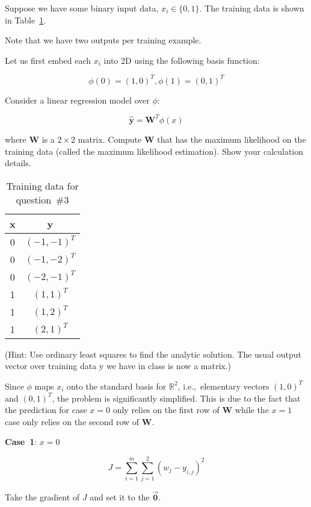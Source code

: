 \begin{problem}
  Suppose we have some binary input data, ${x_i \in \{0, 1\}}$. The training data is shown in Table~\ref{tab:P03:TrainingData}.


\noindent
Note that we have two outputs per training example.

Let us first embed each $x_i$ into 2D using the following basis function:

\[\phi(0) = (1, 0)^{T}, \phi(1) = (0, 1)^{T} \]

Consider a linear regression model over $\phi$:

\[\hat{\mathbf{y}} = \mathbf{W}^{T} \phi(x) \]

\noindent
where $\mathbf{W}$ is a $2\times2$ matrix. Compute $\mathbf{W}$ that has the maximum likelihood on the training data (called the maximum likelihood estimation). Show your calculation details.

\begin{table}[h]
  \centering
  \caption{Training data for question~\#3}\label{tab:P03:TrainingData}
  \begin{tabular}{c|c}
    x & y \\\hline
    0 & $(-1, -1)^{T}$\\
    0 & $(-1, -2)^{T}$\\
    0 & $(-2, -1)^{T}$\\
    1 & $(1, 1)^{T}$\\
    1 & $(1, 2)^{T}$\\
    1 & $(2, 1)^{T}$\\
  \end{tabular}
\end{table}

(Hint: \textnormal{Use ordinary least squares to find the analytic solution. The usual output vector over training data y we have in class is now a matrix.})
\end{problem}

Since $\phi$ maps $x_i$ onto the standard basis for $\mathbb{R}^2$, i.e.,~elementary vectors ${(1,0)}^{T}$ and ${(0,1)}^{T}$, the problem is significantly simplified.  This is due to the fact that the prediction for case $x=0$ only relies on the first row of $\mathbf{W}$ while the $x=1$ case only relies on the second row of $\mathbf{W}$.

\noindent
\textbf{Case~1}: $x=0$

\[ J = \sum_{i=1}^{m} \sum_{j=1}^{2} \left(w_{j} - y_{i,j}\right)^2 \]

\noindent
Take the gradient of $J$ and set it to the $\vec{\mathbf{0}}$.

